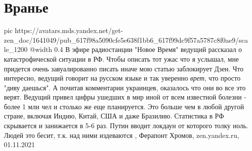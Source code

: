  
 
 
 
 
\chapter{Вранье}

\ifcmt
  pic https://avatars.mds.yandex.net/get-zen_doc/1641049/pub_617f98a5090cfe5e638f1bb6_617f99dc9f57a5787c8f0ae9/scale_1200
  @width 0.4
\fi
В эфире радиостанции "Новое Время" ведущий рассказал о катастрофической
ситуации в РФ. Чтобы описать тот ужас что я услышал, мне придется очень
завуалированно писать иначе мою статью заблокирует Дзен.  Что интересно,
ведущий говорит на русском языке и так уверенно \emph{врет}, что просто "диву
даешься". А почитав комментарии украинцев, оказалось что они во все это верят.
Ведущий привел цифры ушедших в мир иной от всем известной болезни - более 1 млн
чел и столько же еще планируется. Это больше чем в любой другой стране, включая
Индию, Китай, США и даже Бразилию.  Статистика в РФ скрывается и занижается в
5-6 раз. Путин вводит локдаун от которого толку ноль. Людей это бесит, т.к. над
ними издеваются
,
Ферапонт Хромов, zen.yandex.ru, 01.11.2021  
